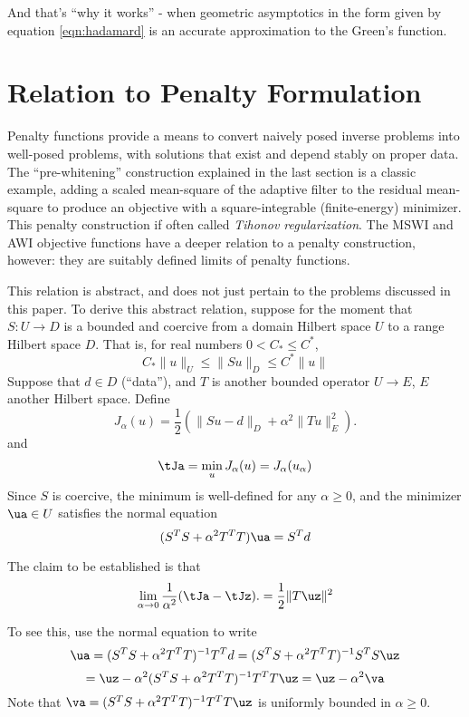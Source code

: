 And that's ``why it works'' - when geometric asymptotics in the form
given by equation \ref{eqn:hadamard} is an accurate approximation to the Green's function.

\section{Relation to Penalty Formulation}
Penalty functions provide a means to convert naively posed
inverse problems into well-posed problems, with solutions that exist
and depend stably on proper data. The ``pre-whitening'' construction
explained in the last section is a classic example, adding a scaled
mean-square of the adaptive filter to the residual mean-square to
produce an objective with a square-integrable (finite-energy)
minimizer. This penalty construction if often called {\em Tihonov
  regularization}. The MSWI and AWI objective functions have a deeper
relation to a penalty construction, however: they are
suitably defined limits of penalty functions.

This relation is abstract, and does not just pertain to the problems
discussed in this paper. To derive this abstract relation, suppose for
the moment that $S:U \rightarrow D$ is a bounded and coercive from a
domain Hilbert space $U$ to a range Hilbert space $D$. That is, for
real numbers $0 < C_* \le C^*$,
\[
  C_*\|u\|_U \le \|Su\|_D \le C^*\|u\|
\]
Suppose that $d \in D$ (``data''), and $T$ is another bounded operator $U \rightarrow E$, $E$
another Hilbert space. Define
\begin{equation}
  \label{eqn:eq1}
  J_{\alpha}(u) = \frac{1}{2}(\|Su-d\|_D + \alpha^2\|Tu\|_E^2).
\end{equation}
and
\begin{equation}
  \label{eqn:eq0}
  \tJa= \min_u J_{\alpha}(u) = J_{\alpha}(u_{\alpha})
\end{equation}
Since $S$ is coercive, the minimum is well-defined for any
$\alpha \ge 0$, and the minimizer $\ua \in U$ satisfies the normal
equation
\begin{equation}
  \label{eqn:eq0n}
  (S^TS + \alpha^2 T^TT) \ua = S^Td
\end{equation}

The claim to be established is that
\begin{equation}
  \label{eqn:eq4}
  \lim_{\alpha \rightarrow 0} \frac{1}{\alpha^2}  (\tJa-\tJz).= \frac{1}{2}\|T\uz\|^2
\end{equation}

To see this, use the normal equation to write
\[
  \ua = (S^TS + \alpha^2 T^TT)^{-1}T^Td = (S^TS + \alpha^2 T^TT)^{-1}S^TS \uz
\]
\begin{equation}
  \label{eqn:eq2}
  = \uz - \alpha^2 (S^TS + \alpha^2 T^TT)^{-1}T^TT\uz = \uz-\alpha^2 \va
\end{equation}
Note that $\va = (S^TS + \alpha^2 T^TT)^{-1}T^TT\uz$ is uniformly bounded in $\alpha \ge 0$.

